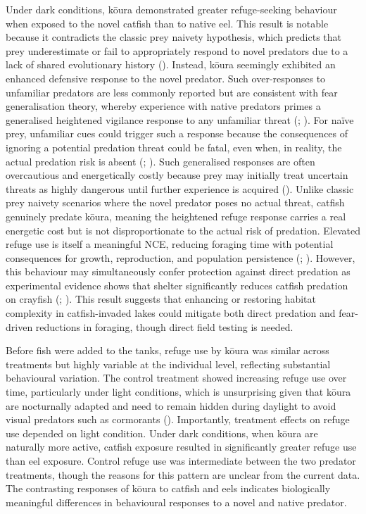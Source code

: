 \documentclass[
  letterpaper,
  DIV=11,
  numbers=noendperiod]{scrartcl}
\begin{document}
Under dark conditions, kōura demonstrated greater refuge-seeking
behaviour when exposed to the novel catfish than to native eel. This
result is notable because it contradicts the classic prey naivety
hypothesis, which predicts that prey underestimate or fail to
appropriately respond to novel predators due to a lack of shared
evolutionary history (). Instead, kōura seemingly exhibited an enhanced defensive
response to the novel predator. Such over-responses to unfamiliar
predators are less commonly reported but are consistent with fear
generalisation theory, whereby experience with native predators primes a
generalised heightened vigilance response to any unfamiliar threat
(;
). For naïve prey, unfamiliar
cues could trigger such a response because the consequences of ignoring
a potential predation threat could be fatal, even when, in reality, the
actual predation risk is absent (; ). Such
generalised responses are often overcautious and energetically costly
because prey may initially treat uncertain threats as highly dangerous
until further experience is acquired (). Unlike classic prey naivety scenarios where the novel predator
poses no actual threat, catfish genuinely predate kōura, meaning the
heightened refuge response carries a real energetic cost but is not
disproportionate to the actual risk of predation. Elevated refuge use is
itself a meaningful NCE, reducing foraging time with potential
consequences for growth, reproduction, and population persistence
(;
). However, this
behaviour may simultaneously confer protection against direct predation
as experimental evidence shows that shelter significantly reduces
catfish predation on crayfish (;
). This result suggests that
enhancing or restoring habitat complexity in catfish-invaded lakes could
mitigate both direct predation and fear-driven reductions in foraging,
though direct field testing is needed.

Before fish were added to the tanks, refuge use by kōura was similar
across treatments but highly variable at the individual level,
reflecting substantial behavioural variation. The control treatment
showed increasing refuge use over time, particularly under light
conditions, which is unsurprising given that kōura are nocturnally
adapted and need to remain hidden during daylight to avoid visual
predators such as cormorants ().
Importantly, treatment effects on refuge use depended on light
condition. Under dark conditions, when kōura are naturally more active,
catfish exposure resulted in significantly greater refuge use than eel
exposure. Control refuge use was intermediate between the two predator
treatments, though the reasons for this pattern are unclear from the
current data. The contrasting responses of kōura to catfish and eels
indicates biologically meaningful differences in behavioural responses
to a novel and native predator.
\end{document}
